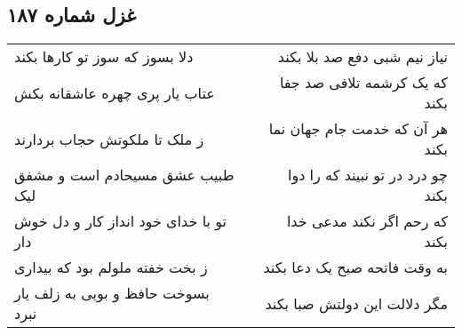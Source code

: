 \begin{center}
\section*{غزل شماره ۱۸۷}
\label{sec:sh187}
\begin{longtable}{l p{0.5cm} r}
دلا بسوز که سوز تو کارها بکند
&&
نیاز نیم شبی دفع صد بلا بکند
\\
عتاب یار پری چهره عاشقانه بکش
&&
که یک کرشمه تلافی صد جفا بکند
\\
ز ملک تا ملکوتش حجاب بردارند
&&
هر آن که خدمت جام جهان نما بکند
\\
طبیب عشق مسیحادم است و مشفق لیک
&&
چو درد در تو نبیند که را دوا بکند
\\
تو با خدای خود انداز کار و دل خوش دار
&&
که رحم اگر نکند مدعی خدا بکند
\\
ز بخت خفته ملولم بود که بیداری
&&
به وقت فاتحه صبح یک دعا بکند
\\
بسوخت حافظ و بویی به زلف یار نبرد
&&
مگر دلالت این دولتش صبا بکند
\\
\end{longtable}
\end{center}
